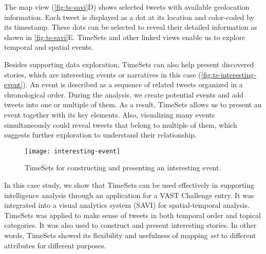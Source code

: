 The map view (\autoref{fig:ts-savi}D) shows selected tweets with available geolocation information. Each tweet is displayed as a dot at its location and color-coded by its timestamp. These dots can be selected to reveal their detailed information as shown in \autoref{fig:ts-savi}E. TimeSets and other linked views enable us to explore temporal and spatial events.

Besides supporting data exploration, TimeSets can also help present discovered stories, which are interesting events or narratives in this case (\autoref{fig:ts-interesting-event}). An event is described as a sequence of related tweets organized in a chronological order. During the analysis, we create potential events and add tweets into one or multiple of them. As a result, TimeSets allows us to present an event together with its key elements. Also, visualizing many events simultaneously could reveal tweets that belong to multiple of them, which suggests further exploration to understand their relationship.

\begin{figure}[!htb]
	\centering
	\texttt{[image: interesting-event]}
	\caption{TimeSets for constructing and presenting an interesting event.}
	\label{fig:ts-interesting-event}
\end{figure}

In this case study, we show that TimeSets can be used effectively in supporting intelligence analysis through an application for a VAST Challenge entry. It was integrated into a visual analytics system (SAVI) for spatial-temporal analysis. TimeSets was applied to make sense of tweets in both temporal order and topical categories. It was also used to construct and present interesting stories. In other words, TimeSets showed its flexibility and usefulness of  mapping \emph{set} to different attributes for different purposes.
